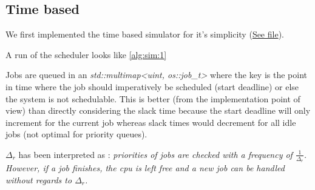 \subsection{Time based}

We first implemented the time based simulator for it's simplicity (\href{../h/os/llf_scheduler_time_based.h}{See file}).

A run of the scheduler looks like \ref{alg:sim:1}


Jobs are queued in an \emph{std::multimap<uint, os::job\_t>} where the key is the point in time where the job should imperatively be scheduled (start deadline) or else the system is not schedulable.
This is better (from the implementation point of view) than directly considering the slack time because the start deadline will only increment for the current job whereas slack times would decrement for all idle jobs (not optimal for priority queues).

$\Delta_r$ has been interpreted as : \emph{priorities of jobs are checked with a frequency of $\frac{1}{\Delta_r}$. However, if a job finishes, the cpu is left free and a new job can be handled without regards to $\Delta_r$.}